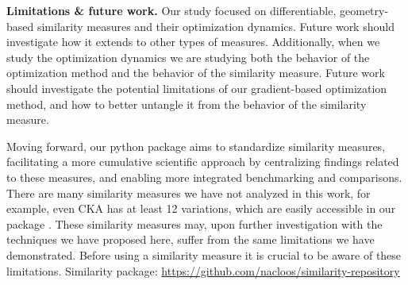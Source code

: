\documentclass{article} %
\begin{document}
\textbf{Limitations \& future work.}
Our study focused on differentiable, geometry-based similarity measures and their optimization dynamics. Future work should investigate how it extends to other types of measures.
Additionally, when we study the optimization dynamics we are studying both the behavior of the optimization method and the behavior of the similarity measure. Future work should investigate the potential limitations of our gradient-based optimization method, and how to better untangle it from the behavior of the similarity measure. 

Moving forward, our python package aims to standardize similarity measures, facilitating a more cumulative scientific approach by centralizing findings related to these measures, and enabling more integrated benchmarking and comparisons. There are many similarity measures we have not analyzed in this work, for example, even CKA has at least 12 variations, which are easily accessible in our package%
. These similarity measures may, upon further investigation with the techniques we have proposed here, suffer from the same limitations we have demonstrated. Before using a similarity measure it is crucial to be aware of these limitations. Similarity package:
\href{https://github.com/nacloos/similarity-repository}{https://github.com/nacloos/similarity-repository}










\end{document}
